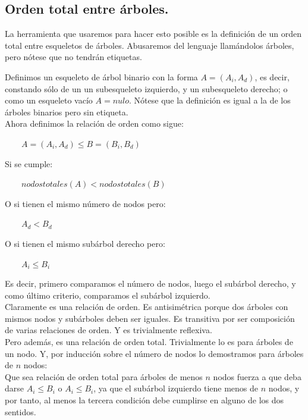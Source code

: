 \documentclass{article}
\renewcommand{\leq}{\leqslant}
\begin{document}
\subsection {Orden total entre árboles.}

La herramienta que usaremos para hacer esto posible es la definición de un orden total entre esqueletos de árboles.
Abusaremos del lenguaje llamándolos árboles, pero nótese que no tendrán etiquetas.

Definimos un esqueleto de árbol binario con la forma $A = (A_i,A_d)$, es decir, constando sólo de un
un subesqueleto izquierdo, y un subesqueleto derecho; o como un esqueleto vacío $A = nulo$. Nótese que la definición
es igual a la de los árboles binarios pero sin etiqueta.\\

Ahora definimos la relación de orden como sigue:
\begin{adjustwidth}{2cm}{}
 $\qquad A = (A_i,A_d) \leq B = (B_i,B_d)$ 
\end{adjustwidth}
 Si se cumple: 
 \begin{adjustwidth}{2cm}{}
 $\qquad nodos totales(A) <  nodos totales(B)$ 
 \end{adjustwidth}
 O si tienen el mismo número de nodos pero: 
 \begin{adjustwidth}{2cm}{}
 $\qquad A_d < B_d$ 
 \end{adjustwidth}
 O si tienen el mismo subárbol derecho pero: 
 \begin{adjustwidth}{2cm}{}
 $\qquad A_i \leq B_i$ 
\end{adjustwidth}
Es decir, primero comparamos el número de nodos, luego el subárbol derecho, y como último criterio, comparamos el subárbol izquierdo.\\

Claramente es una relación de orden. Es antisimétrica porque dos árboles con mismos nodos y subárboles deben ser iguales.
Es transitiva por ser composición de varias relaciones de orden. Y es trivialmente reflexiva. \\

Pero además, es una relación de orden total. Trivialmente lo es para árboles de un nodo. Y, por inducción sobre el número de nodos lo demostramos para árboles de $n$ nodos: \\
\indent Que sea relación de orden total para árboles de menos $n$ nodos fuerza a que deba darse $A_i \leq B_i$ o $A_i \leq B_i$, ya que el subárbol izquierdo 
tiene menos de $n$ nodos, y por tanto, al menos la tercera condición debe cumplirse en alguno de los dos sentidos.
\end{document}
